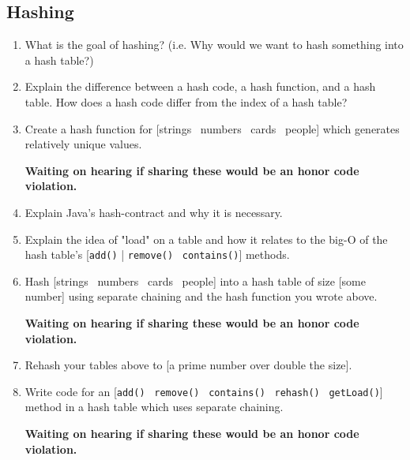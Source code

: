 \documentclass[10pt]{article}
\begin{document}
\subsection{Hashing}
\begin{enumerate}[leftmargin=0em]\addtocounter{enumi}{31}
\item What is the goal of hashing? (i.e. Why would we want to hash something into a hash table?)
\item Explain the difference between a hash code, a hash function, and a hash table. How does a hash code differ from the index of a hash table?
\item Create a hash function for [strings \vline\ numbers \vline\ cards \vline\ people] which generates relatively unique values.

\textbf{Waiting on hearing if sharing these would be an honor code violation.}
\item Explain Java's hash-contract and why it is necessary.
\item Explain the idea of "load" on a table and how it relates to the big-O of the hash table's [\texttt{add()} | \texttt{remove()} \vline\ \texttt{contains()}] methods.
\item Hash [strings \vline\ numbers \vline\ cards \vline\ people] into a hash table of size [some number] using separate chaining and the hash function you wrote above.

\textbf{Waiting on hearing if sharing these would be an honor code violation.}
\item Rehash your tables above to [a prime number over double the size].
\item Write code for an [\texttt{add()} \vline\ \texttt{remove()} \vline\ \texttt{contains()} \vline\ \texttt{rehash()} \vline\ \texttt{getLoad()}] method in a hash table which uses separate chaining.

\textbf{Waiting on hearing if sharing these would be an honor code violation.}
\end{enumerate}
\end{document}
